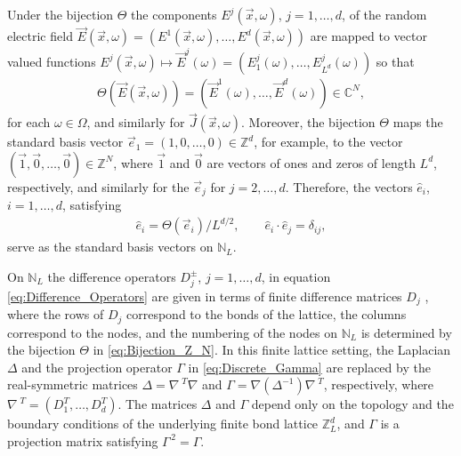 \documentclass{cmslatex}
\begin{document}
Under the bijection $\Theta$ the components
$E^j(\vec{x},\omega)$, $j=1,\ldots,d$, of the random electric field
$\vec{E}(\vec{x},\omega)=(E^1(\vec{x},\omega),\ldots ,E^d(\vec{x},\omega))$ are mapped to
vector valued functions $E^j(\vec{x},\omega)\mapsto\vec{E}^j(\omega)=(E^j_1(\omega),\ldots,
E^j_{L^d}(\omega))$ so that
% 
\begin{align}\label{eq:bijection_vector_mapping}
  \Theta(\vec{E}(\vec{x},\omega))=(\vec{E}^1(\omega),\ldots ,\vec{E}^d(\omega))\in\mathbb{C}^N,
\end{align}
%
for each $\omega\in\Omega$, and similarly for $\vec{J}(\vec{x},\omega)$. Moreover, the
bijection $\Theta$ maps the standard basis vector
$\vec{e}_1=(1,0,\ldots,0)\in\mathbb{Z}^d$, for example, to the
vector $(\vec{1},\vec{0},\ldots,\vec{0})\in\mathbb{Z}^N$, where
$\vec{1}$ and $\vec{0}$ are vectors of ones and zeros of length
$L^d$, respectively, and similarly for the $\vec{e}_j$ for
$j=2,\ldots,d$. Therefore, the vectors $\hat{e}_i$, $i=1,\ldots,d$, satisfying
%
\begin{align}\label{eq:Lattice_Basis_e}
  \hat{e}_i=\Theta(\vec{e}_i)/L^{d/2},
  \qquad
  \hat{e}_i\cdot\hat{e}_j=\delta_{ij},
\end{align}
%
serve as the standard basis vectors on $\mathbb{N}_L$.


On $\mathbb{N}_L$ the difference operators $D_j^\pm$, $j=1,\ldots,d$, in
equation \eqref{eq:Difference_Operators} are given in terms of finite 
difference matrices $D_j$ \cite{Demmel:1997}, where the rows of $D_j$
correspond to the bonds of the lattice, the columns
correspond to the nodes, and the numbering of the nodes on
$\mathbb{N}_L$ is determined by the bijection $\Theta$ in
\eqref{eq:Bijection_Z_N}. In this finite lattice 
setting, the Laplacian $\Delta$ and the projection operator $\Gamma$ in
\eqref{eq:Discrete_Gamma} are replaced by the real-symmetric matrices
$\Delta=\nabla^{\;T}\nabla$ and $\Gamma=\nabla(\Delta^{-1})\nabla^{\;T}$, respectively, where
$\nabla^{\;T}=(D_1^T,\ldots,D_d^T)$. The matrices $\Delta$ and $\Gamma$ depend only on the
topology and the boundary conditions of the underlying finite bond
lattice $\mathbb{Z}_L^d$, and $\Gamma$ is a projection matrix
satisfying $\Gamma^{\,2}=\Gamma$. 
\end{document}

